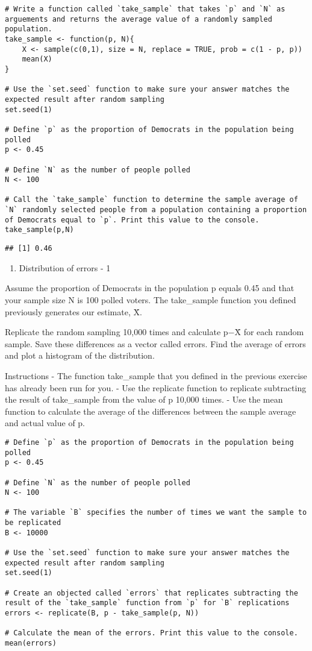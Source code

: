 \documentclass[
]{article}
\providecommand{\tightlist}{%
  \setlength{\itemsep}{0pt}\setlength{\parskip}{0pt}}
\begin{document}
\begin{verbatim}
# Write a function called `take_sample` that takes `p` and `N` as arguements and returns the average value of a randomly sampled population.
take_sample <- function(p, N){
    X <- sample(c(0,1), size = N, replace = TRUE, prob = c(1 - p, p))
    mean(X)
}

# Use the `set.seed` function to make sure your answer matches the expected result after random sampling
set.seed(1)

# Define `p` as the proportion of Democrats in the population being polled
p <- 0.45

# Define `N` as the number of people polled
N <- 100

# Call the `take_sample` function to determine the sample average of `N` randomly selected people from a population containing a proportion of Democrats equal to `p`. Print this value to the console.
take_sample(p,N)
\end{verbatim}

\begin{verbatim}
## [1] 0.46
\end{verbatim}

\begin{enumerate}
\def\labelenumi{\arabic{enumi}.}
\setcounter{enumi}{1}
\tightlist
\item
  Distribution of errors - 1
\end{enumerate}

Assume the proportion of Democrats in the population p equals 0.45 and
that your sample size N is 100 polled voters. The take\_sample function
you defined previously generates our estimate, X̄.

Replicate the random sampling 10,000 times and calculate p−X̄ for each
random sample. Save these differences as a vector called errors. Find
the average of errors and plot a histogram of the distribution.

Instructions - The function take\_sample that you defined in the
previous exercise has already been run for you. - Use the replicate
function to replicate subtracting the result of take\_sample from the
value of p 10,000 times. - Use the mean function to calculate the
average of the differences between the sample average and actual value
of p.~

\begin{verbatim}
# Define `p` as the proportion of Democrats in the population being polled
p <- 0.45

# Define `N` as the number of people polled
N <- 100

# The variable `B` specifies the number of times we want the sample to be replicated
B <- 10000

# Use the `set.seed` function to make sure your answer matches the expected result after random sampling
set.seed(1)

# Create an objected called `errors` that replicates subtracting the result of the `take_sample` function from `p` for `B` replications
errors <- replicate(B, p - take_sample(p, N))

# Calculate the mean of the errors. Print this value to the console.
mean(errors)
\end{verbatim}
\end{document}
